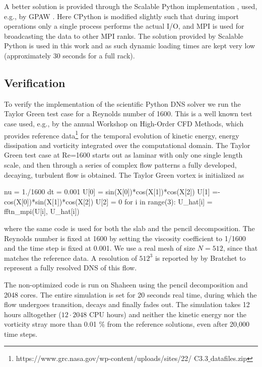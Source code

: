 \documentclass[final,3p,times,twocolumn]{elsarticle}
\begin{document}
A better solution is provided through the Scalable Python implementation 
\cite{scalablepython, Enkovaara201117}, used, e.g., by GPAW \cite{gpaw05}. Here 
CPython is modified slightly such that during import operations only a single 
process performs the actual I/O, and MPI is used for broadcasting the data to 
other MPI ranks. The solution provided by Scalable Python is used in this work 
and as such dynamic loading times are kept very low (approximately 30 seconds 
for a full rack).

\subsection{Verification}
\label{sec:verification}
To verify the implementation of the scientific Python DNS solver we run the 
Taylor Green test case for a Reynolds number of 1600. This is a well known test 
case used, e.g., by the annual Workshop on High-Order CFD Methods, which 
provides reference 
data\footnote{https://www.grc.nasa.gov/wp-content/uploads/sites/22/ 
C3.3$\_$datafiles.zip} for the temporal evolution of kinetic energy, energy 
dissipation and vorticity 
integrated over the computational domain. The Taylor Green test case at Re=1600 
starts out as laminar with only one single length scale, and then through a 
series of complex flow patterns a fully developed, decaying, turbulent flow is 
obtained. The Taylor Green vortex is initialized as
\begin{python}
nu = 1./1600
dt = 0.001
U[0] = sin(X[0])*cos(X[1])*cos(X[2])
U[1] =-cos(X[0])*sin(X[1])*cos(X[2])
U[2] = 0
for i in range(3):
    U_hat[i] = fftn_mpi(U[i], U_hat[i])
\end{python}
where the same code is used for both the slab and the pencil decomposition. The Reynolds number is fixed at 1600 by setting the viscosity coefficient to 1/1600 and the time step is fixed at 0.001. We use a real mesh of size $N=512$, since that matches the reference data. A resolution of $512^3$ is reported by by Bratchet \cite{brachet1991direct} to represent a fully resolved DNS of this flow.

The non-optimized code is run on Shaheen using the pencil decomposition and 2048 cores. The entire simulation is set for 20 seconds real time, during which the flow undergoes transition, decays and finally fades out. The simulation takes 12 hours alltogether ($12\cdot2048$ CPU hours) and neither the kinetic energy nor the vorticity stray more than 0.01 \% from the reference solutions, even after 20,000 time steps.
\end{document}
